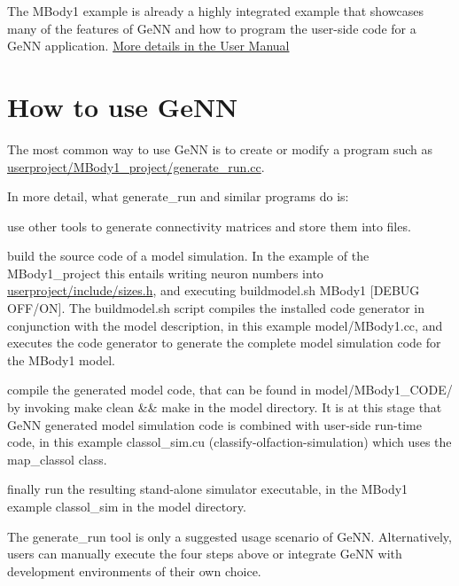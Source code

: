 The M\+Body1 example is already a highly integrated example that showcases many of the features of Ge\+N\+N and how to program the user-\/side code for a Ge\+N\+N application. \hyperlink{Manual}{More details in the User Manual }\hypertarget{1_quickstart_how_to}{}\section{How to use Ge\+N\+N}\label{1_quickstart_how_to}
The most common way to use Ge\+N\+N is to create or modify a program such as {\ttfamily \hyperlink{userproject_2MBody1__project_2generate__run_8cc}{userproject/\+M\+Body1\+\_\+project/generate\+\_\+run.\+cc}}.

In more detail, what {\ttfamily generate\+\_\+run} and similar programs do is\+:
\begin{DoxyEnumerate}
\item use other tools to generate connectivity matrices and store them into files.
\item build the source code of a model simulation. In the example of the M\+Body1\+\_\+project this entails writing neuron numbers into {\ttfamily \hyperlink{sizes_8h}{userproject/include/sizes.\+h}}, and executing {\ttfamily buildmodel.\+sh M\+Body1 \mbox{[}D\+E\+B\+U\+G O\+F\+F/\+O\+N\mbox{]}}. The {\ttfamily buildmodel.\+sh} script compiles the installed code generator in conjunction with the model description, in this example {\ttfamily model/\+M\+Body1.\+cc}, and executes the code generator to generate the complete model simulation code for the M\+Body1 model.
\item compile the generated model code, that can be found in {\ttfamily model/\+M\+Body1\+\_\+\+C\+O\+D\+E/} by invoking {\ttfamily make clean \&\& make} in the {\ttfamily model} directory. It is at this stage that Ge\+N\+N generated model simulation code is combined with user-\/side run-\/time code, in this example {\ttfamily classol\+\_\+sim.\+cu} (classify-\/olfaction-\/simulation) which uses the {\ttfamily map\+\_\+classol} class.
\item finally run the resulting stand-\/alone simulator executable, in the M\+Body1 example {\ttfamily classol\+\_\+sim} in the {\ttfamily model} directory.
\end{DoxyEnumerate}

The {\ttfamily generate\+\_\+run} tool is only a suggested usage scenario of Ge\+N\+N. Alternatively, users can manually execute the four steps above or integrate Ge\+N\+N with development environments of their own choice.


